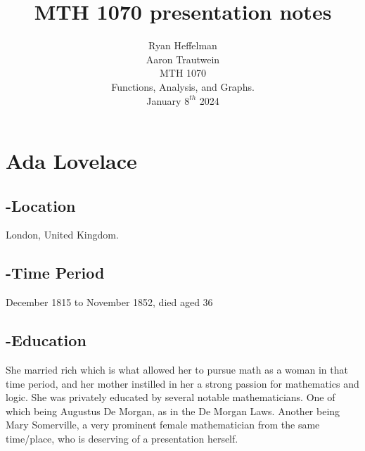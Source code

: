 \documentclass[16pt]{article}
\begin{document}
\Large
\date{}
\title{\LARGE MTH 1070 presentation notes}
\author{\LARGE Ryan Heffelman\\\LARGE Aaron Trautwein \\\LARGE 
MTH 1070 \\\LARGE Functions, Analysis, and Graphs. \\\LARGE January \(8^{th}\) 2024} 
\maketitle

\section{Ada Lovelace}
\subsection{-Location}
London, United Kingdom.

\subsection{-Time Period}
December 1815 to November 1852, died aged 36

\subsection{-Education}
She married rich which is what allowed her to pursue math as a woman in that time period, and her mother instilled in her a strong passion for mathematics and logic. She was privately educated by several notable mathematicians. One of which being Augustus De Morgan, as in the De Morgan Laws. Another being Mary Somerville, a very prominent female mathematician from the same time/place, who is deserving of a presentation herself.
\end{document}
